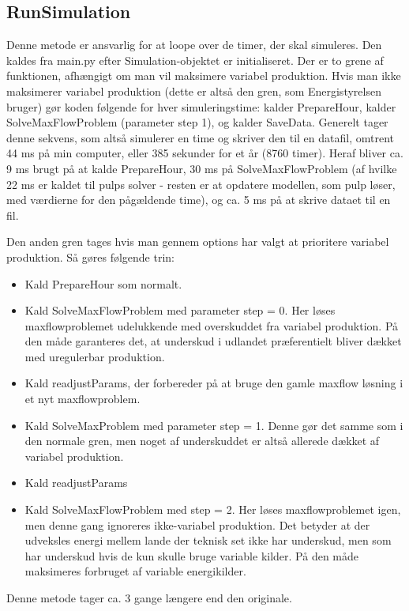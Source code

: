 \documentclass{article}
\begin{document}
\subsection{RunSimulation}
Denne metode er ansvarlig for at loope over de timer, der skal simuleres.  Den kaldes fra main.py efter Simulation-objektet er initialiseret. Der er to grene af funktionen, afhængigt om man vil maksimere variabel produktion. Hvis man ikke maksimerer variabel produktion (dette er altså den gren, som Energistyrelsen bruger) gør koden følgende for hver simuleringstime: kalder PrepareHour, kalder SolveMaxFlowProblem (parameter step 1), og kalder SaveData. Generelt tager denne sekvens, som altså simulerer en time og skriver den til en datafil, omtrent 44 ms på min computer, eller 385 sekunder for et år (8760 timer). Heraf bliver ca. 9 ms brugt på at kalde PrepareHour, 30 ms på SolveMaxFlowProblem (af hvilke 22 ms er kaldet til pulps solver - resten er at opdatere modellen, som pulp løser, med værdierne for den pågældende time), og ca. 5 ms på at skrive dataet til en fil. 

Den anden gren tages hvis man gennem options har valgt at prioritere variabel produktion. Så gøres følgende trin: 
\begin{itemize}
    \item Kald PrepareHour som normalt.
    \item Kald SolveMaxFlowProblem med parameter step = 0. Her løses maxflowproblemet udelukkende med overskuddet fra variabel produktion. På den måde garanteres det, at underskud i udlandet præferentielt bliver dækket med uregulerbar produktion.
    \item Kald readjustParams, der forbereder på at bruge den gamle maxflow løsning i et nyt maxflowproblem.
    \item Kald SolveMaxProblem med parameter step = 1. Denne gør det samme som i den normale gren, men noget af underskuddet er altså allerede dækket af variabel produktion.
    \item Kald readjustParams
    \item Kald SolveMaxFlowProblem med step = 2. Her løses maxflowproblemet igen, men denne gang ignoreres ikke-variabel produktion. Det betyder at der udveksles energi mellem lande der teknisk set ikke har underskud, men som har underskud hvis de kun skulle bruge variable kilder. På den måde maksimeres forbruget af variable energikilder. 
\end{itemize}
Denne metode tager ca. 3 gange længere end den originale.
\end{document}
